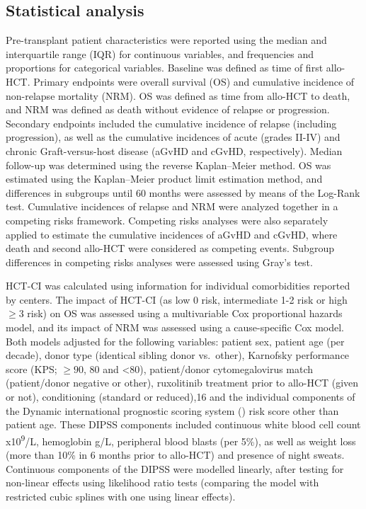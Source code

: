 \documentclass[
  letterpaper,
  paper=240mm:170mm,
  twoside=true,
  open=right,
  fontsize=10pt,
  pagesize=false,
  BCOR=15mm,
  DIV=14,
  headinclude=true,
  footinclude=false,
  headsepline=on]{scrbook}
\begin{document}
\subsection*{Statistical analysis}\label{statistical-analysis}

Pre-transplant patient characteristics were reported using the median
and interquartile range (IQR) for continuous variables, and frequencies
and proportions for categorical variables. Baseline was defined as time
of first allo-HCT. Primary endpoints were overall survival (OS) and
cumulative incidence of non-relapse mortality (NRM). OS was defined as
time from allo-HCT to death, and NRM was defined as death without
evidence of relapse or progression. Secondary endpoints included the
cumulative incidence of relapse (including progression), as well as the
cumulative incidences of acute (grades II-IV) and chronic
Graft-versus-host disease (aGvHD and cGvHD, respectively). Median
follow-up was determined using the reverse Kaplan--Meier method. OS was
estimated using the Kaplan--Meier product limit estimation method, and
differences in subgroups until 60 months were assessed by means of the
Log-Rank test. Cumulative incidences of relapse and NRM were analyzed
together in a competing risks framework. Competing risks analyses were
also separately applied to estimate the cumulative incidences of aGvHD
and cGvHD, where death and second allo-HCT were considered as competing
events. Subgroup differences in competing risks analyses were assessed
using Gray's test.

HCT-CI was calculated using information for individual comorbidities
reported by centers. The impact of HCT-CI (as low 0 risk, intermediate
1-2 risk or high \(\geq 3\) risk) on OS was assessed using a
multivariable Cox proportional hazards model, and its impact of NRM was
assessed using a cause-specific Cox model. Both models adjusted for the
following variables: patient sex, patient age (per decade), donor type
(identical sibling donor vs.~other), Karnofsky performance score (KPS;
\(\geq 90\), 80 and \textless80), patient/donor cytomegalovirus match
(patient/donor negative or other), ruxolitinib treatment prior to
allo-HCT (given or not), conditioning (standard or reduced),16 and the
individual components of the Dynamic international prognostic scoring
system () risk score other than patient age. These DIPSS
components included continuous white blood cell count
x10\textsuperscript{9}/L, hemoglobin g/L, peripheral blood blasts (per
5\%), as well as weight loss (more than 10\% in 6 months prior to
allo-HCT) and presence of night sweats. Continuous components of the
DIPSS were modelled linearly, after testing for non-linear effects using
likelihood ratio tests (comparing the model with restricted cubic
splines with one using linear effects).
\end{document}
